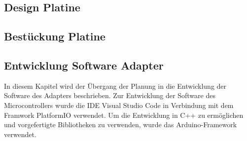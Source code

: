 \documentclass[]{article}
\begin{document}
\subsection{Design Platine}
\subsection{Bestückung Platine}
\subsection{Entwicklung Software Adapter}
In diesem Kapitel wird der Übergang der Planung in die Entwicklung der Software des Adapters beschrieben. 
Zur Entwicklung der Software des Microcontrollers wurde die IDE Visual Studio Code in Verbindung mit dem Framwork PlatformIO verwendet. Um die Entwicklung in C++ zu ermöglichen und vorgefertigte Bibliotheken zu verwenden, wurde das Arduino-Framework verwendet.
\end{document}
